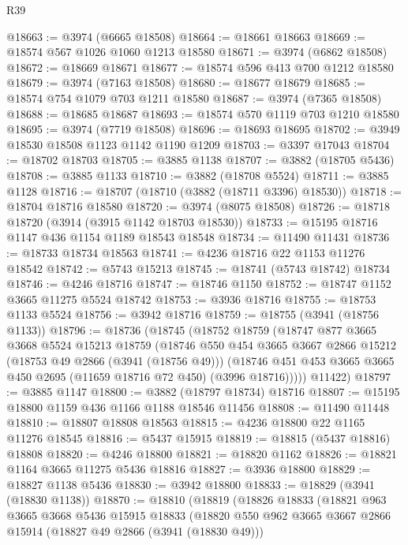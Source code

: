 \begin{lexlean}{R39}
\begin{coremodule}
@18663 := @3974 (@6665 @18508)
@18664 := @18661 @18663
@18669 := @18574 @567 @1026 @1060 @1213 @18580
@18671 := @3974 (@6862 @18508)
@18672 := @18669 @18671
@18677 := @18574 @596 @413 @700 @1212 @18580
@18679 := @3974 (@7163 @18508)
@18680 := @18677 @18679
@18685 := @18574 @754 @1079 @703 @1211 @18580
@18687 := @3974 (@7365 @18508)
@18688 := @18685 @18687
@18693 := @18574 @570 @1119 @703 @1210 @18580
@18695 := @3974 (@7719 @18508)
@18696 := @18693 @18695
@18702 := @3949 @18530 @18508 @1123 @1142 @1190 @1209
@18703 := @3397 @17043
@18704 := @18702 @18703
@18705 := @3885 @1138
@18707 := @3882 (@18705 @5436)
@18708 := @3885 @1133
@18710 := @3882 (@18708 @5524)
@18711 := @3885 @1128
@18716 := @18707 (@18710 (@3882 (@18711 @3396) @18530))
@18718 := @18704 @18716 @18580
@18720 := @3974 (@8075 @18508)
@18726 := @18718 @18720 (@3914 (@3915 @1142 @18703 @18530))
@18733 := @15195 @18716 @1147 @436 @1154 @1189 @18543 @18548
@18734 := @11490 @11431
@18736 := @18733 @18734 @18563
@18741 := @4236 @18716 @22 @1153 @11276 @18542
@18742 := @5743 @15213
@18745 := @18741 (@5743 @18742) @18734
@18746 := @4246 @18716
@18747 := @18746 @1150
@18752 := @18747 @1152 @3665 @11275 @5524 @18742
@18753 := @3936 @18716
@18755 := @18753 @1133 @5524
@18756 := @3942 @18716
@18759 := @18755 (@3941 (@18756 @1133))
@18796 := @18736
    (@18745
      (@18752
        @18759
        (@18747
          @877
          @3665
          @3668
          @5524
          @15213
          @18759
          (@18746
            @550
            @454
            @3665
            @3667
            @2866
            @15212
            (@18753 @49 @2866 (@3941 (@18756 @49)))
            (@18746 @451 @453 @3665 @3665 @450 @2695 (@11659 @18716 @72 @450) (@3996 @18716)))))
      @11422)
@18797 := @3885 @1147
@18800 := @3882 (@18797 @18734) @18716
@18807 := @15195 @18800 @1159 @436 @1166 @1188 @18546 @11456
@18808 := @11490 @11448
@18810 := @18807 @18808 @18563
@18815 := @4236 @18800 @22 @1165 @11276 @18545
@18816 := @5437 @15915
@18819 := @18815 (@5437 @18816) @18808
@18820 := @4246 @18800
@18821 := @18820 @1162
@18826 := @18821 @1164 @3665 @11275 @5436 @18816
@18827 := @3936 @18800
@18829 := @18827 @1138 @5436
@18830 := @3942 @18800
@18833 := @18829 (@3941 (@18830 @1138))
@18870 := @18810
    (@18819
      (@18826
        @18833
        (@18821
          @963
          @3665
          @3668
          @5436
          @15915
          @18833
          (@18820
            @550
            @962
            @3665
            @3667
            @2866
            @15914
            (@18827 @49 @2866 (@3941 (@18830 @49)))

\end{coremodule}
\end{lexlean}
